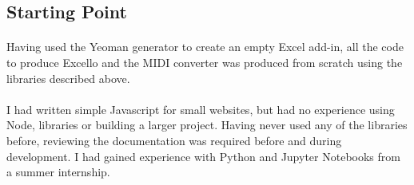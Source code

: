 %
%
\subsection{Starting Point}

\paragraph{} Having used the Yeoman generator to create an empty Excel add-in, all the code to produce Excello and the MIDI converter was produced from scratch using the libraries described above.

\paragraph{} I had written simple Javascript for small websites, but had no experience using Node, libraries or building a larger project. Having never used any of the libraries before, reviewing the documentation was required before and during development. I had gained experience with Python and Jupyter Notebooks from a summer internship.

